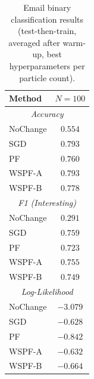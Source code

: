 \begin{table}[t]
\centering
\caption{Email binary classification results (test-then-train, averaged after warm-up, best hyperparameters per particle count).}
\label{tab:email_binary_results}
\small
\renewcommand{\arraystretch}{1.15}
\begin{tabular}{@{}lc@{}}
\toprule
Method & $N=100$ \\
\midrule
\multicolumn{2}{c}{\textit{Accuracy}} \\
\midrule
NoChange & $0.554$ \\
SGD & $0.793$ \\
PF & $0.760$ \\
WSPF-A & $0.793$ \\
WSPF-B & $0.778$ \\
\midrule
\multicolumn{2}{c}{\textit{F1 (Interesting)}} \\
\midrule
NoChange & $0.291$ \\
SGD & $0.759$ \\
PF & $0.723$ \\
WSPF-A & $0.755$ \\
WSPF-B & $0.749$ \\
\midrule
\multicolumn{2}{c}{\textit{Log-Likelihood}} \\
\midrule
NoChange & $-3.079$ \\
SGD & $-0.628$ \\
PF & $-0.842$ \\
WSPF-A & $-0.632$ \\
WSPF-B & $-0.664$ \\
\bottomrule
\end{tabular}
\end{table}
